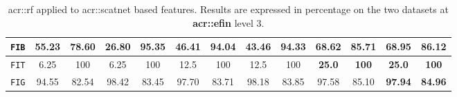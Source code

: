 \begin{sidewaystable}[htpb]
\begin{tabular}{| c | c c | c c | c c | c c | c c | c c |}
                    \hline
                    \texttt{FIB} & 55.23 & 78.60 & 26.80 & 95.35 & 46.41 & 94.04 & 43.46 & 94.33 & 68.62 & 85.71 & \textbf{68.95} & \textbf{86.12} \\
                    \hline
                    \texttt{FIT} & 6.25 & 100 & 6.25 & 100 & 12.5 & 100 & 12.5 & 100 & \textbf{25.0} & \textbf{100} & \textbf{25.0} & \textbf{100} \\
                    \hline
                    \texttt{FIG} & 94.55 & 82.54 & 98.42 & 83.45 & 97.70 & 83.71 & 98.18 & 83.85 & 97.58 & 85.10 & \textbf{97.94} & \textbf{84.96} \\
                    \hline
                \end{tabular}
                \caption{
                    \label{tab::stats_scat_rf_f3}
                    \gls{acr::rf} applied to \gls{acr::scatnet} based features.
                    Results are expressed in percentage on the two datasets at \textbf{\gls{acr::efin}} level 3.
                }
            \end{sidewaystable}
